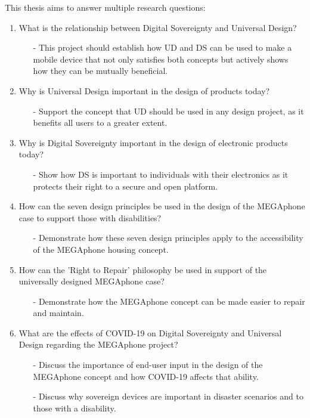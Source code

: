 This thesis aims to answer multiple research questions:

\begin{enumerate}
    \item What is the relationship between Digital Sovereignty and Universal Design?
        \begin{enumerate}
        \item[-] This project should establish how UD and DS can be used to make a mobile device that not only satisfies both concepts but actively shows how they can be mutually beneficial.
        \end{enumerate} 
    \item Why is Universal Design important in the design of products today?
        \begin{enumerate}
        \item[-] Support the concept that UD should be used in any design project, as it benefits all users to a greater extent.
        \end{enumerate}
    \item Why is Digital Sovereignty important in the design of electronic products today?
        \begin{enumerate}
        \item[-] Show how DS is important to individuals with their electronics as it protects their right to a secure and open platform.
        \end{enumerate} 
    \item How can the seven design principles be used in the design of the MEGAphone case to support those with disabilities?
        \begin{enumerate}
        \item[-] Demonstrate how these seven design principles apply to the accessibility of the MEGAphone housing concept.
        \end{enumerate} 
    \item How can the 'Right to Repair' philosophy be used in support of the universally designed MEGAphone case?
        \begin{enumerate}
        \item[-] Demonstrate how the MEGAphone concept can be made easier to repair and maintain.
        \end{enumerate} 
    \item What are the effects of COVID-19 on Digital Sovereignty and Universal Design regarding the MEGAphone project?
        \begin{enumerate}
        \item[-] Discuss the importance of end-user input in the design of the MEGAphone concept and how COVID-19 affects that ability.
        \item[-] Discuss why sovereign devices are important in disaster scenarios and to those with a disability.
        \end{enumerate} 
\end{enumerate}

